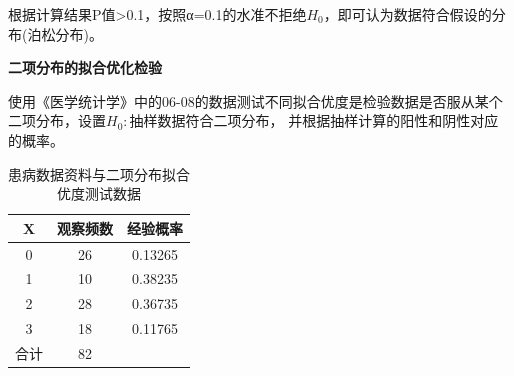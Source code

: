 \documentclass[
]{article}
\begin{document}
根据计算结果P值\textgreater0.1，按照α=0.1的水准不拒绝\(H_0\)，即可认为数据符合假设的分布(泊松分布)。

\textbf{二项分布的拟合优化检验}

使用《医学统计学》中的06-08的数据测试不同拟合优度是检验数据是否服从某个二项分布，设置\(H_0:\)抽样数据符合二项分布，
并根据抽样计算的阳性和阴性对应的概率。

\begin{table}

\caption{\label{tab:chisqtab11}患病数据资料与二项分布拟合优度测试数据}
\centering
\begin{tabular}[t]{ccc}
\toprule
X & 观察频数 & 经验概率\\
\midrule
0 & 26 & 0.13265\\
1 & 10 & 0.38235\\
2 & 28 & 0.36735\\
3 & 18 & 0.11765\\
合计 & 82 & \\
\bottomrule
\end{tabular}
\end{table}
\end{document}
